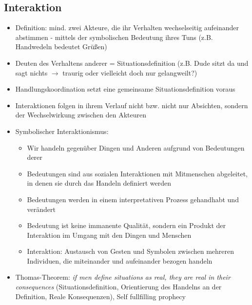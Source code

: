 \documentclass{scrartcl}
\begin{document}
\subsection*{Interaktion}
\begin{itemize}
    \item
        Definition: mind. zwei Akteure, die ihr Verhalten wechselseitig aufeinander abstimmen - mittels der symbolischen Bedeutung ihres Tuns (z.B. Handwedeln bedeutet Grüßen)
    \item
        Deuten des Verhaltens anderer = Situationsdefinition (z.B. Dude sitzt da und sagt nichts $\rightarrow$ traurig oder vielleicht doch nur gelangweilt?)
    \item
        Handlungskoordination setzt eine gemeinsame Situationsdefinition voraus
    \item
        Interaktionen folgen in ihrem Verlauf nicht bzw. nicht nur Absichten, sondern der Wechselwirkung zwischen den Akteuren
    \item
        Symbolischer Interaktionismus:
        \begin{itemize}
            \item
                Wir handeln gegenüber Dingen und Anderen aufgrund von Bedeutungen derer
            \item
                Bedeutungen sind aus sozialen Interaktionen mit Mitmenschen abgeleitet, in denen sie durch das Handeln definiert werden
            \item
                Bedeutungen werden in einem interpretativen Prozess gehandhabt und verändert
            \item
                Bedeutung ist keine immanente Qualität, sondern ein Produkt der Interaktion im Umgang mit den Dingen und Menschen
            \item
                Interaktion: Austausch von Gesten und Symbolen zwischen mehreren Individuen, die miteinander und aufeinander bezogen handeln
        \end{itemize}
    \item
        Thomas-Theorem: \textit{if men define situations as real, they are real in their consequences} (Situationsdefinition, Orientierung des Handelns an der Definition, Reale Konsequenzen), Self fullfilling prophecy
\end{itemize}
\end{document}
